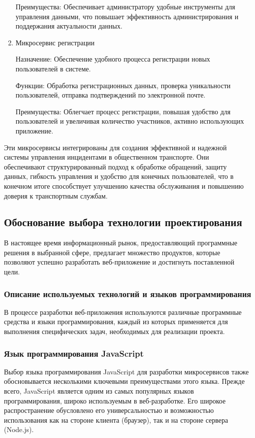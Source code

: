 \begin{enumerate}
	Преимущества: Обеспечивает администратору удобные инструменты для управления данными, что повышает эффективность администрирования и поддержания актуальности данных.
	
	\item Микросервис регистрации
	
	Назначение: Обеспечение удобного процесса регистрации новых пользователей в системе.
	
	Функции: Обработка регистрационных данных, проверка уникальности пользователей, отправка подтверждений по электронной почте.
	
	Преимущества: Облегчает процесс регистрации, повышая удобство для пользователей и увеличивая количество участников, активно использующих приложение.
\end{enumerate}

Эти микросервисы интегрированы для создания эффективной и надежной системы управления инцидентами в общественном транспорте. Они обеспечивают структурированный подход к обработке обращений, защиту данных, гибкость управления и удобство для конечных пользователей, что в конечном итоге способствует улучшению качества обслуживания и повышению доверия к транспортным службам.

\subsection{Обоснование выбора технологии проектирования}

В настоящее время информационный рынок, предоставляющий программные решения в выбранной сфере, предлагает множество продуктов, которые позволяют успешно разработать веб-приложение и достигнуть поставленной цели.

\subsubsection{Описание используемых технологий и языков программирования}

В процессе разработки веб-приложения используются различные программные средства и языки программирования, каждый из которых применяется для выполнения специфических задач, необходимых для реализации проекта.

\subsubsection{Язык программирования JavaScript}

Выбор языка программирования JavaScript для разработки микросервисов также обосновывается несколькими ключевыми преимуществами этого языка. Прежде всего, JavaScript является одним из самых популярных языков программирования, широко используемым в веб-разработке. Его широкое распространение обусловлено его универсальностью и возможностью использования как на стороне клиента (браузер), так и на стороне сервера (Node.js).

